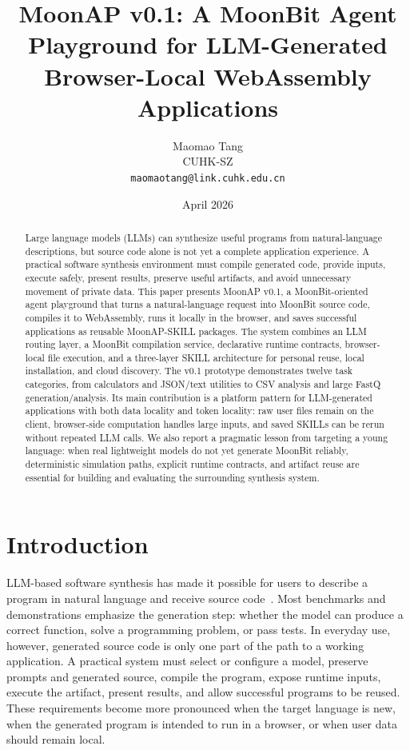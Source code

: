 \documentclass[11pt]{article}
\title{\textbf{MoonAP v0.1: A MoonBit Agent Playground for LLM-Generated Browser-Local WebAssembly Applications}}
\author{
  Maomao Tang\\
  CUHK-SZ\\
  \texttt{maomaotang@link.cuhk.edu.cn}
}
\date{April 2026}
\newcommand{\moonap}{MoonAP}
\newcommand{\skill}{SKILL}
\newcommand{\wasm}{WebAssembly}
\begin{document}
\maketitle

\begin{abstract}
Large language models (LLMs) can synthesize useful programs from natural-language descriptions, but source code alone is not yet a complete application experience. A practical software synthesis environment must compile generated code, provide inputs, execute safely, present results, preserve useful artifacts, and avoid unnecessary movement of private data. This paper presents \moonap{} v0.1, a MoonBit-oriented agent playground that turns a natural-language request into MoonBit source code, compiles it to \wasm{}, runs it locally in the browser, and saves successful applications as reusable \moonap{}-\skill{} packages. The system combines an LLM routing layer, a MoonBit compilation service, declarative runtime contracts, browser-local file execution, and a three-layer \skill{} architecture for personal reuse, local installation, and cloud discovery. The v0.1 prototype demonstrates twelve task categories, from calculators and JSON/text utilities to CSV analysis and large FastQ generation/analysis. Its main contribution is a platform pattern for LLM-generated applications with both data locality and token locality: raw user files remain on the client, browser-side computation handles large inputs, and saved \skill{}s can be rerun without repeated LLM calls. We also report a pragmatic lesson from targeting a young language: when real lightweight models do not yet generate MoonBit reliably, deterministic simulation paths, explicit runtime contracts, and artifact reuse are essential for building and evaluating the surrounding synthesis system.
\end{abstract}

\section{Introduction}

LLM-based software synthesis has made it possible for users to describe a program in natural language and receive source code~\cite{chen2021evaluating,austin2021program,li2022competition}. Most benchmarks and demonstrations emphasize the generation step: whether the model can produce a correct function, solve a programming problem, or pass tests. In everyday use, however, generated source code is only one part of the path to a working application. A practical system must select or configure a model, preserve prompts and generated source, compile the program, expose runtime inputs, execute the artifact, present results, and allow successful programs to be reused. These requirements become more pronounced when the target language is new, when the generated program is intended to run in a browser, or when user data should remain local.
\end{document}
